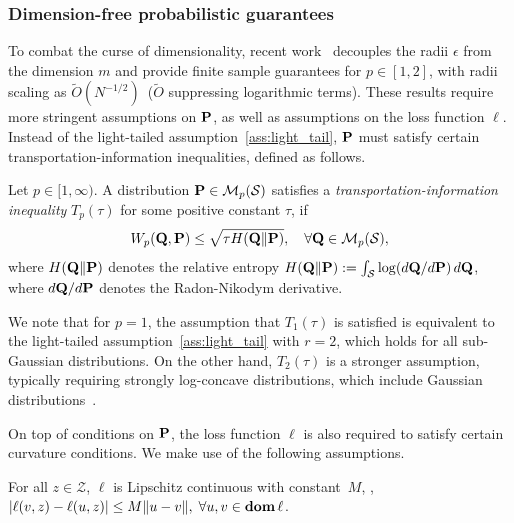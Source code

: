 \subsubsection{Dimension-free probabilistic guarantees}
To combat the curse of dimensionality, recent work~\cite{gao2016distributionally} decouples the radii $\epsilon$ from the dimension $m$ and provide finite sample guarantees for $p \in [1,2]$, with radii scaling as $\tilde{O}(N^{-1/2})$~($\tilde{O}$ suppressing logarithmic terms). %
These results require more stringent assumptions on ${\mathbf P}$, as well as assumptions on the loss function $\ell$.
Instead of the light-tailed assumption~\ref{ass:light_tail}, ${\mathbf P}$ must satisfy certain transportation-information inequalities, defined as follows. 

\begin{definition}
\label{def:trans}
Let $p \in [1,\infty)$.
A distribution ${\mathbf P} \in \mathcal{M}_p(\mathcal{S})$ satisfies a \emph{transportation-information inequality} $T_p(\tau)$ for some positive constant $\tau$, if
\begin{equation*}
	W_p(\mathbf{Q}, {\mathbf P}) \leq \sqrt{\tau H(\mathbf{Q} \| {\mathbf P})}, \quad \forall \mathbf{Q} \in \mathcal{M}_p(\mathcal{S}),
\end{equation*}
where $H(\mathbf{Q} \| {\mathbf P})$ denotes the relative entropy $H(\mathbf{Q} \| {\mathbf P}) := \int_{\mathcal{S}} \log(d\mathbf{Q}/d{\mathbf P}) \, d\mathbf{Q}$, where $d\mathbf{Q}/d{\mathbf P}$ denotes the Radon-Nikodym derivative.
\end{definition}

We note that for $p=1$, the assumption that $T_1(\tau)$ is satisfied is equivalent to the light-tailed assumption~\ref{ass:light_tail} with $r = 2$, which holds for all sub-Gaussian distributions. On the other hand, $T_2(\tau)$ is a stronger assumption, typically requiring strongly log-concave distributions, which include Gaussian distributions~\cite{gao2016distributionally}.

On top of conditions on ${\mathbf P}$, the loss function $\ell$ is also required to satisfy certain curvature conditions. We make use of the following assumptions. 
\begin{assumption}[Lipschitzness]
\label{ass:lip_intro}
For all $z \in \mathcal{Z}$, $\ell$ is Lipschitz continuous with constant~$M$,
\ie, $\left |\ell(v,z) - \ell(u,z)\right| \leq M\| u - v\|, \; \forall u,v \in \mathop{\bf dom} \ell$.
\end{assumption}


